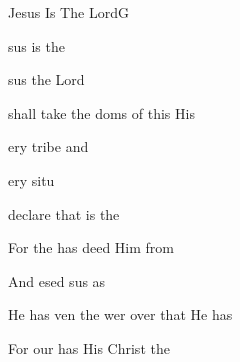 \documentclass[12pt]{book}
\newcommand{\RevDate}{\today}
\newcommand{\NotCCLIed}{\relax}
\begin{document}
\begin{song}{Jesus Is The Lord}{G}
  {}
  {}
  {}
  {\NotCCLIed}

  \renewcommand{\RevDate}{February~11,~1993}

  \begin{SBOpGroup}
    sus is the 
    
    sus the Lord 
    
     shall take the doms of this   His  
    
    ery tribe and 
    
    ery situ
    
     declare that  is the  
  \end{SBOpGroup}

  \begin{SBChorus}
    For the    has deed Him from 

    And esed sus as  

    He has ven  the wer over  that He has 

    For our  has  His Christ the 
  \end{SBChorus}
\end{song}
\end{document}
